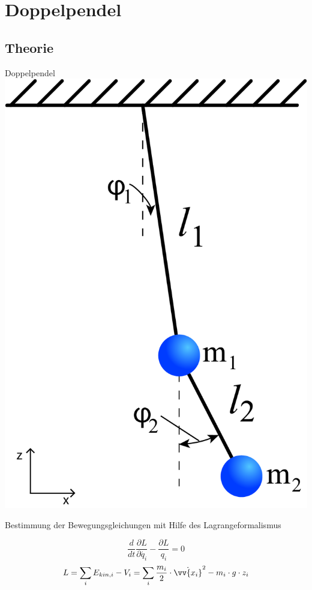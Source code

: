 \section{Doppelpendel}
\subsection{Theorie}
\begin{frame}{Doppelpendel}
	\centering
	\includegraphics[width=.4\textwidth]{images/4/double-pendulum}
\end{frame}

\begin{frame}{Bestimmung der Bewegungsgleichungen mit Hilfe des Lagrangeformalismus}
	\begin{block}
		
		\begin{equation}
			\frac{d}{dt}\frac{\partial L}{\partial\dot{q_i}}-\frac{\partial L}{q_i} =0
		\label{lagrangegl}
		\end{equation}
		\begin{equation}
			 L=\sum_i E_{kin,i}-V_i=\sum_i \frac{m_i}{2}\cdot\dot{\vv{x_i}}^2 - m_i \cdot g \cdot z_i
		\end{equation}
	\end{block}
\end{frame}

